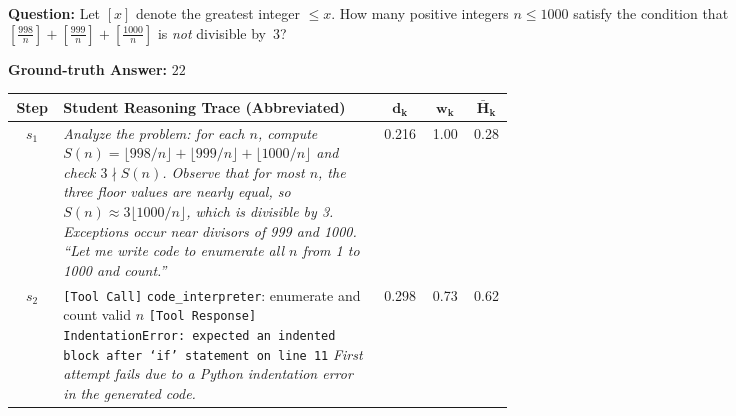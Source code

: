 \begin{figure}[t]
\centering

\begin{tcolorbox}[
  colback=white, colframe=black!70, boxrule=0.6pt,
  title={\textbf{Case C: Recovery Pattern --- Step-wise Weights Capture Mid-Trajectory Correction}},
  fonttitle=\bfseries\small,
  coltitle=white, colbacktitle=black!70,
  top=4pt, bottom=4pt, left=6pt, right=6pt
]

\noindent\colorbox{gray!10}{\parbox{0.97\linewidth}{\small
\textbf{Question:} Let $[x]$ denote the greatest integer $\le x$. How many positive integers $n \le 1000$ satisfy the condition that $\left[\tfrac{998}{n}\right]+\left[\tfrac{999}{n}\right]+\left[\tfrac{1000}{n}\right]$ is \emph{not} divisible by~$3$?

\textbf{Ground-truth Answer:} $22$
}}

\vspace{6pt}

\renewcommand{\arraystretch}{1.3}
{\small
\begin{tabular}{@{} c p{0.64\linewidth} c c c @{}}
\toprule
\textbf{Step} & \textbf{Student Reasoning Trace (Abbreviated)} & $\boldsymbol{d_k}$ & $\boldsymbol{w_k}$ & $\boldsymbol{\bar{H}_k}$ \\
\midrule

$s_1$ &
\textit{Analyze the problem: for each $n$, compute $S(n) = \lfloor 998/n \rfloor + \lfloor 999/n \rfloor + \lfloor 1000/n \rfloor$ and check $3 \nmid S(n)$. Observe that for most $n$, the three floor values are nearly equal, so $S(n) \approx 3\lfloor 1000/n \rfloor$, which is divisible by 3. Exceptions occur near divisors of 999 and 1000.}
\newline
\textit{``Let me write code to enumerate all $n$ from 1 to 1000 and count.''}
& 0.216 & \cellcolor{green!18} 1.00 & 0.28 \\

\midrule

$s_2$ &
\texttt{[Tool Call]} \texttt{code\_interpreter}: enumerate and count valid $n$
\newline
\texttt{[Tool Response]} \textcolor{red!70!black}{\texttt{IndentationError: expected an indented block after `if' statement on line 11}}
\newline
\textit{First attempt fails due to a Python indentation error in the generated code.}
& 0.298 & \cellcolor{yellow!25} 0.73 & 0.62 \\

\midrule


\end{tabular}}
\end{tcolorbox}
\end{figure}
